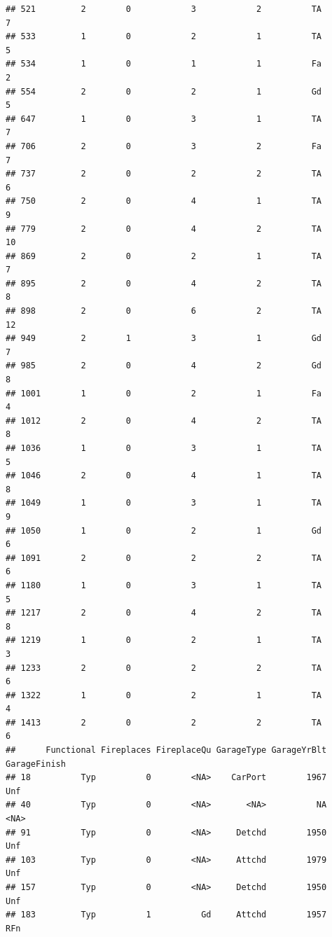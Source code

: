 \documentclass[]{article}
\begin{document}
\begin{verbatim}
## 521         2        0            3            2          TA            7
## 533         1        0            2            1          TA            5
## 534         1        0            1            1          Fa            2
## 554         2        0            2            1          Gd            5
## 647         1        0            3            1          TA            7
## 706         2        0            3            2          Fa            7
## 737         2        0            2            2          TA            6
## 750         2        0            4            1          TA            9
## 779         2        0            4            2          TA           10
## 869         2        0            2            1          TA            7
## 895         2        0            4            2          TA            8
## 898         2        0            6            2          TA           12
## 949         2        1            3            1          Gd            7
## 985         2        0            4            2          Gd            8
## 1001        1        0            2            1          Fa            4
## 1012        2        0            4            2          TA            8
## 1036        1        0            3            1          TA            5
## 1046        2        0            4            1          TA            8
## 1049        1        0            3            1          TA            9
## 1050        1        0            2            1          Gd            6
## 1091        2        0            2            2          TA            6
## 1180        1        0            3            1          TA            5
## 1217        2        0            4            2          TA            8
## 1219        1        0            2            1          TA            3
## 1233        2        0            2            2          TA            6
## 1322        1        0            2            1          TA            4
## 1413        2        0            2            2          TA            6
##      Functional Fireplaces FireplaceQu GarageType GarageYrBlt GarageFinish
## 18          Typ          0        <NA>    CarPort        1967          Unf
## 40          Typ          0        <NA>       <NA>          NA         <NA>
## 91          Typ          0        <NA>     Detchd        1950          Unf
## 103         Typ          0        <NA>     Attchd        1979          Unf
## 157         Typ          0        <NA>     Detchd        1950          Unf
## 183         Typ          1          Gd     Attchd        1957          RFn

\end{verbatim}
\end{document}
